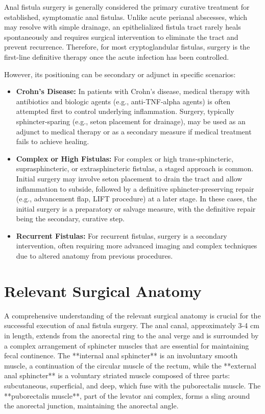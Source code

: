 Anal fistula surgery is generally considered the primary curative treatment for established, symptomatic anal fistulas. Unlike acute perianal abscesses, which may resolve with simple drainage, an epithelialized fistula tract rarely heals spontaneously and requires surgical intervention to eliminate the tract and prevent recurrence. Therefore, for most cryptoglandular fistulas, surgery is the first-line definitive therapy once the acute infection has been controlled.

However, its positioning can be secondary or adjunct in specific scenarios:
\begin{itemize}
  \item \textbf{Crohn's Disease:} In patients with Crohn's disease, medical therapy with antibiotics and biologic agents (e.g., anti-TNF-alpha agents) is often attempted first to control underlying inflammation. Surgery, typically sphincter-sparing (e.g., seton placement for drainage), may be used as an adjunct to medical therapy or as a secondary measure if medical treatment fails to achieve healing.
  \item \textbf{Complex or High Fistulas:} For complex or high trans-sphincteric, suprasphincteric, or extrasphincteric fistulas, a staged approach is common. Initial surgery may involve seton placement to drain the tract and allow inflammation to subside, followed by a definitive sphincter-preserving repair (e.g., advancement flap, LIFT procedure) at a later stage. In these cases, the initial surgery is a preparatory or salvage measure, with the definitive repair being the secondary, curative step.
  \item \textbf{Recurrent Fistulas:} For recurrent fistulas, surgery is a secondary intervention, often requiring more advanced imaging and complex techniques due to altered anatomy from previous procedures.
\end{itemize}

\section*{Relevant Surgical Anatomy}
A comprehensive understanding of the relevant surgical anatomy is crucial for the successful execution of anal fistula surgery. The anal canal, approximately 3-4 cm in length, extends from the anorectal ring to the anal verge and is surrounded by a complex arrangement of sphincter muscles that are essential for maintaining fecal continence. The **internal anal sphincter** is an involuntary smooth muscle, a continuation of the circular muscle of the rectum, while the **external anal sphincter** is a voluntary striated muscle composed of three parts: subcutaneous, superficial, and deep, which fuse with the puborectalis muscle. The **puborectalis muscle**, part of the levator ani complex, forms a sling around the anorectal junction, maintaining the anorectal angle.

